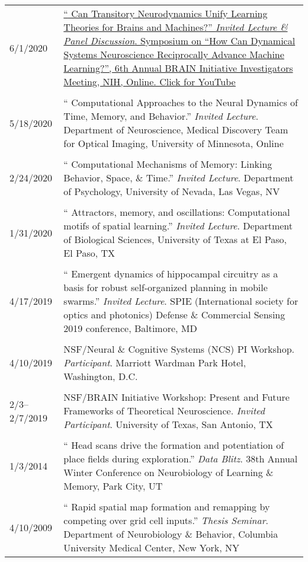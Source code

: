 \documentclass[10pt]{article}
\newcommand{\itemtitle}[1]{{\color{hopkinsblue}\ul{#1}}}
\newcommand{\unpubtitle}[1]{{\color{hopkinsblue} #1}}
\begin{document}
\begin{longtable}{@{\hspace{0.2in}}l>{\raggedright\arraybackslash}p{}}
  6/1/2020 \hspace{0.3in} &
  \href{https://youtu.be/2jy1ENYHRAw?t=902}{``\unpubtitle{Can Transitory
    Neurodynamics Unify Learning Theories for Brains and Machines?}''
    \emph{Invited Lecture \& Panel Discussion}. Symposium on ``How Can Dynamical
    Systems Neuroscience Reciprocally Advance Machine Learning?'', 6th Annual
    BRAIN Initiative Investigators Meeting, NIH, Online. \itemtitle{Click for
  YouTube}}\\
  \tabularnewline
  5/18/2020 \hspace{0.3in} & ``\unpubtitle{Computational Approaches to the
  Neural Dynamics of Time, Memory, and Behavior}.'' \emph{Invited Lecture}.
  Department of Neuroscience, Medical Discovery Team for Optical Imaging,
  University of Minnesota, Online\\
  \tabularnewline
  2/24/2020 \hspace{0.3in} & ``\unpubtitle{Computational Mechanisms of Memory:
  Linking Behavior, Space, \& Time}.'' \emph{Invited Lecture}. Department of
  Psychology, University of Nevada, Las Vegas, NV\\
  \tabularnewline
  1/31/2020 \hspace{0.3in} & ``\unpubtitle{Attractors, memory, and oscillations:
  Computational motifs of spatial learning}.'' \emph{Invited Lecture}.
  Department of Biological Sciences, University of Texas at El Paso, El Paso, TX\\
  \tabularnewline
  4/17/2019 \hspace{0.3in} & ``\unpubtitle{Emergent dynamics of hippocampal
  circuitry as a basis for robust self-organized planning in mobile swarms}.''
  \emph{Invited Lecture}. SPIE (International society for optics and photonics)
  Defense \& Commercial Sensing 2019 conference, Baltimore, MD\\
  \tabularnewline
  4/10/2019 & NSF/Neural \& Cognitive Systems (NCS) PI
  Workshop. \emph{Participant}. Marriott Wardman Park Hotel, Washington, D.C.\\
  \tabularnewline
  2/3--2/7/2019 & NSF/BRAIN Initiative Workshop: Present and Future Frameworks
  of Theoretical Neuroscience. \emph{Invited Participant}. University of Texas,
  San Antonio, TX\\
  \tabularnewline
  1/3/2014 & ``\unpubtitle{Head scans drive the formation and potentiation
  of place fields during exploration}.'' \emph{Data Blitz}. 38th Annual Winter
  Conference on Neurobiology of Learning \& Memory, Park City, UT\\
  \tabularnewline
  4/10/2009 & ``\unpubtitle{Rapid spatial map formation and remapping by
  competing over grid cell inputs}.'' \emph{Thesis Seminar}. Department of
  Neurobiology \& Behavior, Columbia University Medical Center, New York, NY\\
\end{longtable}
\end{document}
